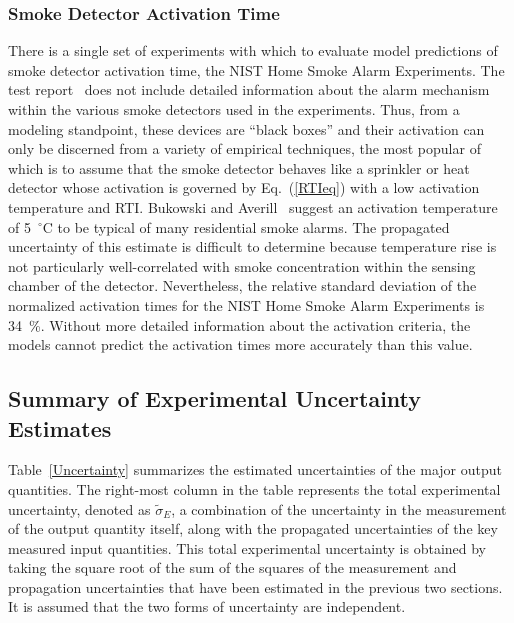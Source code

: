 \subsubsection{Smoke Detector Activation Time}

There is a single set of experiments with which to evaluate model predictions of smoke detector activation time, the NIST Home Smoke Alarm Experiments. The test report~\cite{Bukowski:1} does not include detailed information about the alarm mechanism within the various smoke detectors used in the experiments. Thus, from a modeling standpoint, these devices are ``black boxes'' and their activation can only be discerned from a variety of empirical techniques, the most popular of which is to assume that the smoke detector behaves like a sprinkler or heat detector whose activation is governed by Eq.~(\ref{RTIeq}) with a low activation temperature and RTI. Bukowski and Averill~\cite{Bukowski:2} suggest an activation temperature of 5~$^\circ$C to be typical of many residential smoke alarms. The propagated uncertainty of this estimate is difficult to determine because temperature rise is not particularly well-correlated with smoke concentration within the sensing chamber of the detector. Nevertheless, the relative standard deviation of the normalized activation times for the NIST Home Smoke Alarm Experiments is 34~\%. Without more detailed information about the activation criteria, the models cannot predict the activation times more accurately than this value.

\subsection{Summary of Experimental Uncertainty Estimates}

Table~\ref{Uncertainty} summarizes the estimated uncertainties of the major output quantities. The right-most column in the table represents the total experimental uncertainty, denoted as $\widetilde{\sigma}_E$, a combination of the uncertainty in the measurement of the output quantity itself, along with the propagated uncertainties of the key measured input quantities. This total experimental uncertainty is obtained by taking the square root of the sum of the squares of the measurement and propagation uncertainties that have been estimated in the previous two sections. It is assumed that the two forms of uncertainty are independent.

